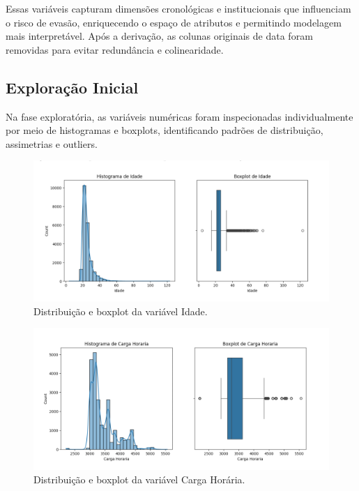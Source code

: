 \documentclass[english, spanish, brazilian]{RBIEarticle} %
\begin{document}
Essas variáveis capturam dimensões cronológicas e institucionais que influenciam o risco de evasão, enriquecendo o espaço de atributos e permitindo modelagem mais interpretável. Após a derivação, as colunas originais de data foram removidas para evitar redundância e colinearidade.

\subsection{Exploração Inicial}

Na fase exploratória, as variáveis numéricas foram inspecionadas individualmente por meio de histogramas e boxplots, identificando padrões de distribuição, assimetrias e outliers.

\begin{figure}[H]\centering
    \includegraphics[width=1\textwidth]{images/descritivo-idade.png}
    \caption{Distribuição e boxplot da variável Idade.}
    \label{fig:idade}
\end{figure}

\begin{figure}[H]\centering
	\includegraphics[width=1\textwidth]{images/descritivo-carga-horaria.png}
	\caption{Distribuição e boxplot da variável Carga Horária.}
	\label{fig:carga-horaria}
\end{figure}
\end{document}
